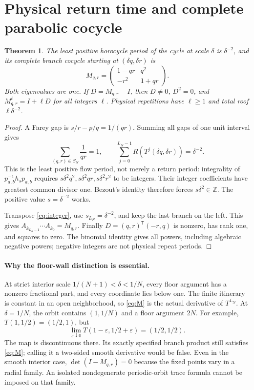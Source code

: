 \documentclass[10pt]{article}
\newcommand{\Z}{\mathbb Z}
\newtheorem{theorem}{Theorem}
\begin{document}
\section{Physical return time and complete parabolic cocycle}
\begin{theorem}\label{thm:clock}
The least positive horocycle period of the cycle at scale $\delta$ is
$\delta^{-2}$, and its complete branch cocycle starting at
$(\delta q,\delta r)$ is
\begin{equation}\label{eq:M}
M_{q,r}=\begin{pmatrix}1-qr&q^2\\-r^2&1+qr\end{pmatrix}.
\end{equation}
Both eigenvalues are one. If $D=M_{q,r}-I$, then $D\ne0$, $D^2=0$,
and $M_{q,r}^{\ell}=I+\ell D$ for all integers $\ell$.
Physical repetitions have $\ell\geq1$ and total roof $\ell\delta^{-2}$.
\end{theorem}
\begin{proof}
A Farey gap is $s/r-p/q=1/(qr)$.
Summing all gaps of one unit interval gives
\[
\sum_{(q,r)\in S_N}\frac1{qr}=1,\qquad
\sum_{j=0}^{L_N-1}R(T^j(\delta q,\delta r))=\delta^{-2}.
\]
This is the least positive flow period, not merely a return period:
integrality of $p_{a,b}^{-1}h_s p_{a,b}$ requires
$s\delta^2q^2,s\delta^2qr,s\delta^2r^2$ to be integers.
Their integer coefficients have greatest common divisor one.
Bezout's identity therefore forces $s\delta^2\in\Z$.
The positive value $s=\delta^{-2}$ works.

Transpose \eqref{eq:integer}, use $s_{L_N}=\delta^{-2}$, and keep the
last branch on the left. This gives
$A_{k_{L_N-1}}\cdots A_{k_0}=M_{q,r}$.
Finally
$D=(q,r)^{\mathsf T}(-r,q)$ is nonzero, has rank one, and squares to zero.
The binomial identity gives all powers, including algebraic negative
powers; negative integers are not physical repeat periods.
\end{proof}

\paragraph{Why the floor-wall distinction is essential.}
At strict interior scale $1/(N+1)<\delta<1/N$, every floor argument has a
nonzero fractional part, and every coordinate lies below one. The finite
itinerary is constant in an open neighborhood, so \eqref{eq:M} is the
actual derivative of $T^{L_N}$.
At $\delta=1/N$, the orbit contains $(1,1/N)$ and a floor argument $2N$.
For example, $T(1,1/2)=(1/2,1)$, but
\[
\lim_{\varepsilon\downarrow0}T(1-\varepsilon,1/2+\varepsilon)
=(1/2,1/2).
\]
The map is discontinuous there. Its exactly specified branch product still
satisfies \eqref{eq:M}; calling it a two-sided smooth derivative would be
false. Even in the smooth interior case, $\det(I-M_{q,r})=0$ because the
fixed points vary in a radial family. An isolated nondegenerate
periodic-orbit trace formula cannot be imposed on that family.
\end{document}
